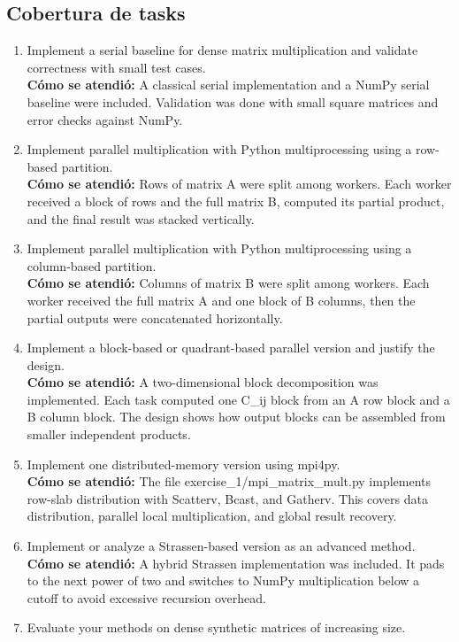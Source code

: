 \documentclass[11pt]{article}
\begin{document}
\subsection*{Cobertura de tasks}
\begin{enumerate}[leftmargin=*]
\item Implement a serial baseline for dense matrix multiplication and validate correctness with small test cases.\\
\textbf{Cómo se atendió:} A classical serial implementation and a NumPy serial baseline were included. Validation was done with small square matrices and error checks against NumPy.
\item Implement parallel multiplication with Python multiprocessing using a row-based partition.\\
\textbf{Cómo se atendió:} Rows of matrix A were split among workers. Each worker received a block of rows and the full matrix B, computed its partial product, and the final result was stacked vertically.
\item Implement parallel multiplication with Python multiprocessing using a column-based partition.\\
\textbf{Cómo se atendió:} Columns of matrix B were split among workers. Each worker received the full matrix A and one block of B columns, then the partial outputs were concatenated horizontally.
\item Implement a block-based or quadrant-based parallel version and justify the design.\\
\textbf{Cómo se atendió:} A two-dimensional block decomposition was implemented. Each task computed one C\_ij block from an A row block and a B column block. The design shows how output blocks can be assembled from smaller independent products.
\item Implement one distributed-memory version using mpi4py.\\
\textbf{Cómo se atendió:} The file exercise\_1/mpi\_matrix\_mult.py implements row-slab distribution with Scatterv, Bcast, and Gatherv. This covers data distribution, parallel local multiplication, and global result recovery.
\item Implement or analyze a Strassen-based version as an advanced method.\\
\textbf{Cómo se atendió:} A hybrid Strassen implementation was included. It pads to the next power of two and switches to NumPy multiplication below a cutoff to avoid excessive recursion overhead.
\item Evaluate your methods on dense synthetic matrices of increasing size.\\

\end{enumerate}
\end{document}
